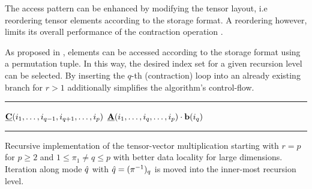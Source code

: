 The access pattern can be enhanced by modifying the tensor layout, i.e reordering tensor elements according to the storage format.
A reordering however, limits its overall performance of the contraction operation \cite{shi:2016:tensor.contraction}.

As proposed in \cite{bassoy:2018:fast}, elements can be accessed according to the storage format using a permutation tuple.
In this way, the desired index set for a given recursion level can be selected.
By inserting the $q$-th (contraction) loop into an already existing branch for $r>1$ additionally simplifies the algorithm's control-flow.
\begin{algorithm}[t]
\DontPrintSemicolon
{}
%
\footnotesize 
\SetAlgoVlined
\hrule
\BlankLine
{}
{
	{
	}
	{
		{
			\;
		}		
	}	
	\Else%
	{
		{
			{
				$\underline{\mathbf{C}}(i_1,\dots,i_{q-1},i_{q+1},\dots,i_{p})$ \ttt{+=} $\underline{\mathbf{A}}(i_1,\dots,i_q,\dots,i_p) \cdot \mathbf{b}(i_q)$\;
			}
		}
	}
}
\BlankLine
\hrule
\caption{
	\footnotesize Recursive implementation of the tensor-vector multiplication starting with $r=p$ for $p \geq 2$ and $1 \leq \pi_1 \neq q \leq p$ with better data locality for large dimensions.
	Iteration along mode $\hat{q}$ with $\hat{q} = (\pi^{-1})_q$ is moved into the inner-most recursion level.
	\label{alg:ttv.sequential.blocked}
}
\end{algorithm}
